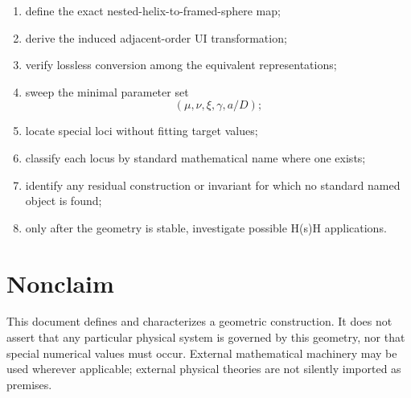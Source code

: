 \documentclass[11pt]{article}
\begin{document}
\begin{enumerate}
    \item define the exact nested-helix-to-framed-sphere map;
    \item derive the induced adjacent-order UI transformation;
    \item verify lossless conversion among the equivalent representations;
    \item sweep the minimal parameter set
    \[
    (\mu,\nu,\xi,\gamma,a/D);
    \]
    \item locate special loci without fitting target values;
    \item classify each locus by standard mathematical name where one exists;
    \item identify any residual construction or invariant for which no standard
          named object is found;
    \item only after the geometry is stable, investigate possible H(s)H
          applications.
\end{enumerate}

\section{Nonclaim}

This document defines and characterizes a geometric construction.  It does not
assert that any particular physical system is governed by this geometry, nor
that special numerical values must occur.  External mathematical machinery may
be used wherever applicable; external physical theories are not silently
imported as premises.
\end{document}
